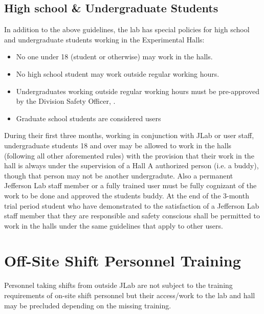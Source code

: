 \documentclass[10pt]{article}
\begin{document}

\subsection{High school \& Undergraduate Students}

In addition to the above guidelines, the lab has special policies for high school and undergraduate 
students working in the Experimental Halls:
\begin{itemize}
\item{No one under 18 (student or otherwise) may work in the halls.}
\item{No high school student may work outside regular working hours.}
\item{Undergraduates working outside regular working hours must be pre-approved by the Division 
Safety Officer, \DSO.}
\item{Graduate school students are considered users}
\end{itemize}
During their first three months, working in conjunction with JLab or user staff, undergraduate students 
18 and over may be allowed to work in the halls (following all other aforemented rules)
with the provision that their work in the hall is always under the supervision of a 
Hall A authorized person (i.e. a buddy), though that person may not be another undergradute.
Also a permanent Jefferson Lab staff member or a fully trained user must
be fully cognizant of the work to be done and approved the students buddy. 
At the end of the 3-month trial period student who have demonstrated to the satisfaction of a Jefferson 
Lab staff member that they are responsible and safety conscious shall be permitted to work in the halls under the same guidelines that apply to other users.


\section{Off-Site Shift Personnel Training}
Personnel taking shifts from outside JLab are not subject to the training requirements of on-site shift personnel but their access/work to the lab and hall may be precluded depending on the missing training.
\end{document}
